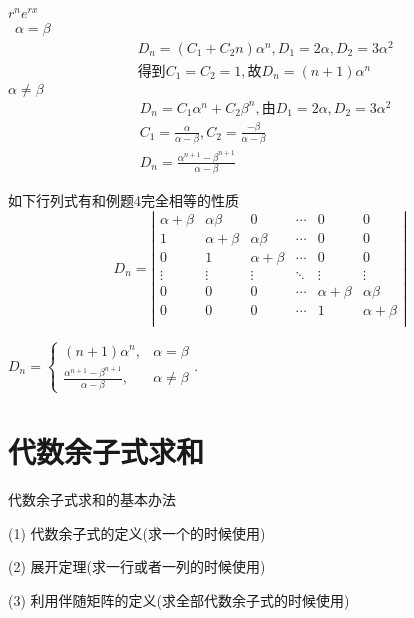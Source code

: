 \documentclass[12pt, a4paper, oneside, UTF8]{ctexbook}
\begin{document}
\begin{enumerate}[label=\arabic*.]
\begin{solution}
    $r^n$$e^{rx}$ \\
    \ $\alpha=\beta$
    \begin{align*}
        & D_n=(C_1+C_2n)\alpha^n, D_1 = 2\alpha, D_2 = 3\alpha^2 \\
        & \text{得到}C_1=C_2=1,{故}D_n=(n+1)\alpha^n 
    \end{align*}
     $\alpha\neq\beta$ 
    \begin{align*}
        &D_n=C_1\alpha^n+C_2\beta^n, \text{由}D_1 = 2\alpha, D_2 = 3\alpha^2 \\
        &C_1 = \frac{\alpha}{\alpha - \beta}, C_2=\frac{-\beta}{\alpha-\beta} \\
        &D_n= \frac{\alpha^{n+1}-\beta^{n+1}}{\alpha-\beta}
    \end{align*}
    \end{solution}
\end{enumerate}

\begin{corollary}
    如下行列式有和例题4完全相等的性质
    $$ 
    D_{n} = \left| 
    \begin{array}{cccccc}
    \alpha+\beta & \alpha\beta & 0 & \cdots & 0 & 0 \\
    1 & \alpha+\beta & \alpha\beta & \cdots & 0 & 0 \\
    0 & 1 & \alpha+\beta & \cdots & 0 & 0 \\
    \vdots & \vdots & \vdots & \ddots & \vdots & \vdots \\
    0 & 0 & 0 & \cdots & \alpha+\beta & \alpha\beta \\
    0 & 0 & 0 & \cdots & 1 & \alpha+\beta \\
    \end{array} 
    \right| 
    $$

    \( {D}_{n} = 
    \left\{  
        {\begin{matrix} \left( {n + 1}\right) {\alpha }^{n}, 
            & \alpha  = \beta \\  
            \frac{{\alpha }^{n + 1} - {\beta }^{n + 1}}
                {\alpha  - \beta }, & 
                \alpha  \neq  \beta  \end{matrix}.}
    \right. \)
\end{corollary}
\section{代数余子式求和}

\begin{remark}
    代数余子式求和的基本办法
    \item [(1)] 代数余子式的定义(求一个的时候使用)
    \item [(2)] 展开定理(求一行或者一列的时候使用)
    \item [(3)] 利用伴随矩阵的定义(求全部代数余子式的时候使用)
\end{remark}
\end{document}
